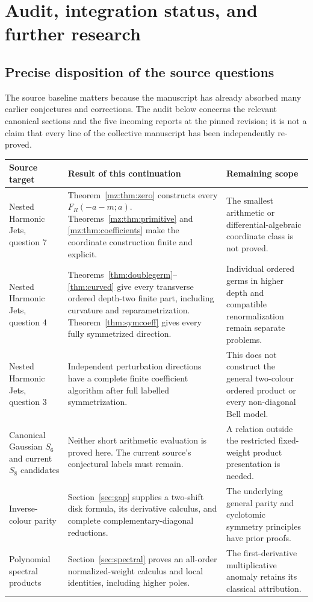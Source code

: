 \documentclass[11pt,letterpaper]{article}
\numberwithin{equation}{section}
\theoremstyle{plain}
\theoremstyle{definition}
\theoremstyle{remark}
\begin{document}
\section{Audit, integration status, and further research}
\label{sec:audit}

\subsection{Precise disposition of the source questions}

The source baseline matters because the manuscript has already absorbed
many earlier conjectures and corrections. The audit below concerns the
relevant canonical sections and the five incoming reports at the pinned
revision; it is not a claim that every line of the collective manuscript
has been independently re-proved.

\begin{longtable}{@{}>{\raggedright\arraybackslash}p{}>{\raggedright\arraybackslash}p{}>{\raggedright\arraybackslash}p{}@{}}
\toprule Source target & Result of this continuation & Remaining scope\\\midrule
\endhead
Nested Harmonic Jets, question 7 &
Theorem~\ref{mz:thm:zero} constructs every $F_R(-a-m;a)$.
Theorems~\ref{mz:thm:primitive} and \ref{mz:thm:coefficients} make the
coordinate construction finite and explicit. &
The smallest arithmetic or differential-algebraic coordinate class is
not proved.\\[5pt]
Nested Harmonic Jets, question 4 &
Theorems~\ref{thm:doublegerm}--\ref{thm:curved} give every transverse
ordered depth-two finite part, including curvature and reparametrization.
Theorem~\ref{thm:symcoeff} gives every fully symmetrized direction. &
Individual ordered germs in higher depth and compatible renormalization
remain separate problems.\\[5pt]
Nested Harmonic Jets, question 3 &
Independent perturbation directions have a complete finite coefficient
algorithm after full labelled symmetrization. &
This does not construct the general two-colour ordered product or every
non-diagonal Bell model.\\[5pt]
Canonical Gaussian $S_6$ and current $S_8$ candidates &
Neither short arithmetic evaluation is proved here. The current
source's conjectural labels must remain. &
A relation outside the restricted fixed-weight product presentation is
needed.\\[5pt]
Inverse-colour parity &
Section~\ref{sec:gap} supplies a two-shift disk formula, its derivative
calculus, and complete complementary-diagonal reductions. &
The underlying general parity and cyclotomic symmetry principles have
prior proofs.\\[5pt]
Polynomial spectral products &
Section~\ref{sec:spectral} proves an all-order normalized-weight calculus
and local identities, including higher poles. &
The first-derivative multiplicative anomaly retains its classical
attribution.\\
\bottomrule
\end{longtable}
\end{document}

